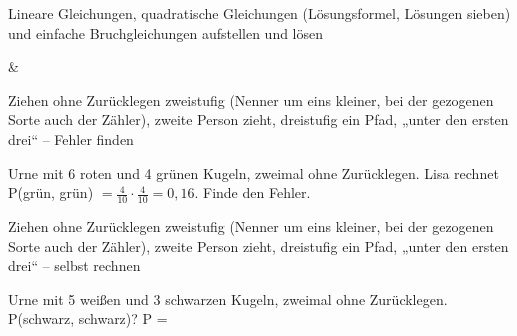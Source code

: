 \begin{aufgabe}{Lineare Gleichungen, quadratische Gleichungen (Lösungsformel, Lösungen sieben) und einfache Bruchgleichungen aufstellen und lösen}
\begin{gleichungsraster}[2]
 &
 \\
\end{gleichungsraster}
\end{aufgabe}

\begin{aufgabe}{Ziehen ohne Zurücklegen zweistufig (Nenner um eins kleiner, bei der gezogenen Sorte auch der Zähler), zweite Person zieht, dreistufig ein Pfad, „unter den ersten drei“ – Fehler finden}
\begin{teile}
\teil Urne mit 6 roten und 4 grünen Kugeln, zweimal ohne Zurücklegen. Lisa rechnet P(grün, grün) $= \frac{4}{10} \cdot \frac{4}{10} = 0{,}16$. Finde den Fehler.
\end{teile}
\end{aufgabe}

\begin{aufgabe}{Ziehen ohne Zurücklegen zweistufig (Nenner um eins kleiner, bei der gezogenen Sorte auch der Zähler), zweite Person zieht, dreistufig ein Pfad, „unter den ersten drei“ – selbst rechnen}
\begin{teile}
\teil Urne mit 5 weißen und 3 schwarzen Kugeln, zweimal ohne Zurücklegen. P(schwarz, schwarz)? P = \leerfeld
\end{teile}
\end{aufgabe}
